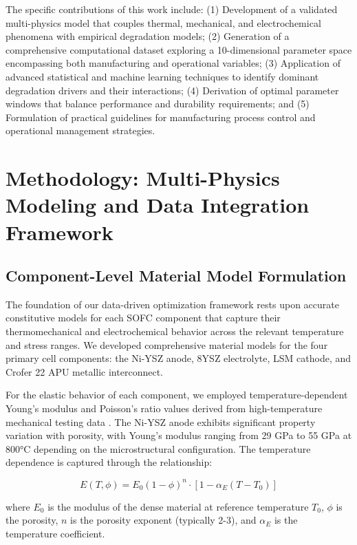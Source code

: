 \documentclass[conference]{IEEEtran}
\begin{document}
The specific contributions of this work include: (1) Development of a validated multi-physics model that couples thermal, mechanical, and electrochemical phenomena with empirical degradation models; (2) Generation of a comprehensive computational dataset exploring a 10-dimensional parameter space encompassing both manufacturing and operational variables; (3) Application of advanced statistical and machine learning techniques to identify dominant degradation drivers and their interactions; (4) Derivation of optimal parameter windows that balance performance and durability requirements; and (5) Formulation of practical guidelines for manufacturing process control and operational management strategies.

\section{Methodology: Multi-Physics Modeling and Data Integration Framework}

\subsection{Component-Level Material Model Formulation}

The foundation of our data-driven optimization framework rests upon accurate constitutive models for each SOFC component that capture their thermomechanical and electrochemical behavior across the relevant temperature and stress ranges. We developed comprehensive material models for the four primary cell components: the Ni-YSZ anode, 8YSZ electrolyte, LSM cathode, and Crofer 22 APU metallic interconnect.

For the elastic behavior of each component, we employed temperature-dependent Young's modulus and Poisson's ratio values derived from high-temperature mechanical testing data \cite{atkinson2024mechanical}. The Ni-YSZ anode exhibits significant property variation with porosity, with Young's modulus ranging from 29 GPa to 55 GPa at 800°C depending on the microstructural configuration. The temperature dependence is captured through the relationship:

\begin{equation}
E(T,\phi) = E_0(1-\phi)^n \cdot \left[1 - \alpha_E(T-T_0)\right]
\end{equation}

where $E_0$ is the modulus of the dense material at reference temperature $T_0$, $\phi$ is the porosity, $n$ is the porosity exponent (typically 2-3), and $\alpha_E$ is the temperature coefficient.
\end{document}
